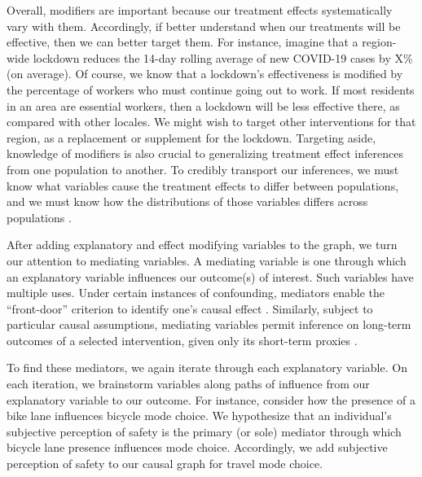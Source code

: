 Overall, modifiers are important because our treatment effects systematically vary with them.
Accordingly, if better understand when our treatments will be effective, then we can better target them.
For instance, imagine that a region-wide lockdown reduces the 14-day rolling average of new COVID-19 cases by X\% (on average).
Of course, we know that a lockdown's effectiveness is modified by the percentage of workers who must continue going out to work.
If most residents in an area are essential workers, then a lockdown will be less effective there, as compared with other locales.
We might wish to target other interventions for that region, as a replacement or supplement for the lockdown.
Targeting aside, knowledge of modifiers is also crucial to generalizing treatment effect inferences from one population to another.
To credibly transport our inferences, we must know what variables cause the treatment effects to differ between populations, and we must know how the distributions of those variables differs across populations \citep{pearl_2014_external}.

After adding explanatory and effect modifying variables to the graph, we turn our attention to mediating variables.
A mediating variable is one through which an explanatory variable influences our outcome(s) of interest.
Such variables have multiple uses.
Under certain instances of confounding, mediators enable the ``front-door'' criterion to identify one's causal effect \citep{glynn_2018_front, bellemare_2019_paper, gupta_2020_estimating}.
Similarly, subject to particular causal assumptions, mediating variables permit inference on long-term outcomes of a selected intervention, given only its short-term proxies \citep{athey_2019_estimating, yang_2020_targeting}.

To find these mediators, we again iterate through each explanatory variable.
On each iteration, we brainstorm variables along paths of influence from our explanatory variable to our outcome.
For instance, consider how the presence of a bike lane influences bicycle mode choice.
We hypothesize that an individual's subjective perception of safety is the primary (or sole) mediator through which bicycle lane presence influences mode choice.
Accordingly, we add subjective perception of safety to our causal graph for travel mode choice.


